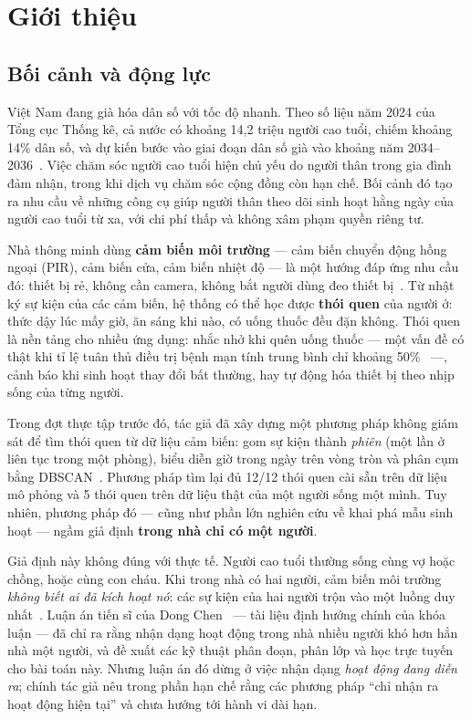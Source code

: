 \chapter{Giới thiệu}
\label{chap:intro}

\section{Bối cảnh và động lực}

Việt Nam đang già hóa dân số với tốc độ nhanh. Theo số liệu năm 2024 của Tổng cục Thống kê, cả
nước có khoảng 14,2 triệu người cao tuổi, chiếm khoảng 14\% dân số, và dự kiến bước vào giai
đoạn dân số già vào khoảng năm 2034--2036~\cite{vnexpress2024tuoigia}. Việc chăm sóc người cao
tuổi hiện chủ yếu do người thân trong gia đình đảm nhận, trong khi dịch vụ chăm sóc cộng đồng
còn hạn chế. Bối cảnh đó tạo ra nhu cầu về những công cụ giúp người thân theo dõi sinh hoạt
hằng ngày của người cao tuổi từ xa, với chi phí thấp và không xâm phạm quyền riêng tư.

Nhà thông minh dùng \textbf{cảm biến môi trường} --- cảm biến chuyển động hồng ngoại (PIR), cảm
biến cửa, cảm biến nhiệt độ --- là một hướng đáp ứng nhu cầu đó: thiết bị rẻ, không cần camera,
không bắt người dùng đeo thiết bị~\cite{cook2013casas,bouchabou2021survey}. Từ nhật ký sự kiện
của các cảm biến, hệ thống có thể học được \textbf{thói quen} của người ở: thức dậy lúc mấy giờ,
ăn sáng khi nào, có uống thuốc đều đặn không. Thói quen là nền tảng cho nhiều ứng dụng: nhắc nhở
khi quên uống thuốc --- một vấn đề có thật khi tỉ lệ tuân thủ điều trị bệnh mạn tính trung bình
chỉ khoảng 50\%~\cite{who2003adherence} ---, cảnh báo khi sinh hoạt thay đổi bất thường, hay tự
động hóa thiết bị theo nhịp sống của từng người.

Trong đợt thực tập trước đó, tác giả đã xây dựng một phương pháp không giám sát để tìm thói quen
từ dữ liệu cảm biến: gom sự kiện thành \emph{phiên} (một lần ở liên tục trong một phòng), biểu
diễn giờ trong ngày trên vòng tròn và phân cụm bằng DBSCAN~\cite{ester1996dbscan}. Phương pháp
tìm lại đủ 12/12 thói quen cài sẵn trên dữ liệu mô phỏng và 5 thói quen trên dữ liệu thật của
một người sống một mình. Tuy nhiên, phương pháp đó --- cũng như phần lớn nghiên cứu về khai phá
mẫu sinh hoạt --- ngầm giả định \textbf{trong nhà chỉ có một người}.

Giả định này không đúng với thực tế. Người cao tuổi thường sống cùng vợ hoặc chồng, hoặc cùng con
cháu. Khi trong nhà có hai người, cảm biến môi trường \emph{không biết ai đã kích hoạt nó}: các
sự kiện của hai người trộn vào một luồng duy nhất~\cite{benmansour2015survey,wang2021smrt}. Luận
án tiến sĩ của Dong Chen~\cite{chen2021thesis} --- tài liệu định hướng chính của khóa luận ---
đã chỉ ra rằng nhận dạng hoạt động trong nhà nhiều người khó hơn hẳn nhà một người, và đề xuất
các kỹ thuật phân đoạn, phân lớp và học trực tuyến cho bài toán này. Nhưng luận án đó dừng ở việc
nhận dạng \emph{hoạt động đang diễn ra}; chính tác giả nêu trong phần hạn chế rằng các phương
pháp ``chỉ nhận ra hoạt động hiện tại'' và chưa hướng tới hành vi dài hạn.

